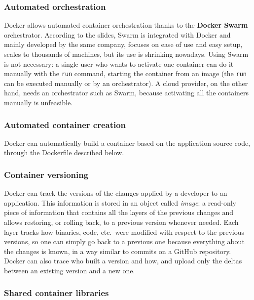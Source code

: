 \subsubsection*{Automated orchestration}

Docker allows automated container orchestration thanks to the \textbf{Docker Swarm} orchestrator. According to the slides, Swarm is integrated with Docker and mainly developed by the same company, focuses on ease of use and easy setup, scales to thousands of machines, but its use is shrinking nowadays. Using Swarm is not necessary: a single user who wants to activate one container can do it manually with the \texttt{run} command, starting the container from an image (the \texttt{run} can be executed manually or by an orchestrator). A cloud provider, on the other hand, needs an orchestrator such as Swarm, because activating all the containers manually is unfeasible.

\subsubsection*{Automated container creation}

Docker can automatically build a container based on the application source code, through the Dockerfile described below.

\subsubsection*{Container versioning}

Docker can track the versions of the changes applied by a developer to an application. This information is stored in an object called \emph{image}: a read-only piece of information that contains all the layers of the previous changes and allows restoring, or rolling back, to a previous version whenever needed. Each layer tracks how binaries, code, etc.\ were modified with respect to the previous versions, so one can simply go back to a previous one because everything about the changes is known, in a way similar to commits on a GitHub repository. Docker can also trace who built a version and how, and upload only the deltas between an existing version and a new one.

\subsubsection*{Shared container libraries}

